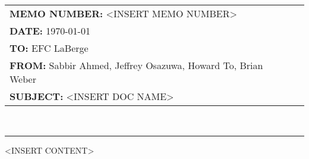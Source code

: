 \documentclass[paper=usletter, fontsize=12pt]{article}
\newcommand{\Sabbir}{Sabbir Ahmed}
\newcommand{\Jeffrey}{Jeffrey Osazuwa}
\newcommand{\Howard}{Howard To}
\newcommand{\Brian}{Brian Weber}
\newcommand{\documentinfo}[5]{
    \begin{centering}
        \parbox{2in}{
        \begin{spacing}{1}
            \begin{flushleft}
                \begin{tabular}{l l}
                    #1 \\
                    #2 \\
                    #3 \\
                    #4 \\
                    #5 \\
                \end{tabular}\\
                \rule{\textwidth}{1pt}
            \end{flushleft}
        \end{spacing}
        }
    \end{centering}
}
\begin{document}
     \documentinfo{\textbf{MEMO NUMBER:} <INSERT MEMO NUMBER>}{\textbf{DATE:} \today}{\textbf{TO: } EFC LaBerge}{\textbf{FROM: }\Sabbir, \Jeffrey, \Howard, \Brian}{\textbf{SUBJECT: } <INSERT DOC NAME>}
    \vspace{-0.3in}

    <INSERT CONTENT>
\end{document}
